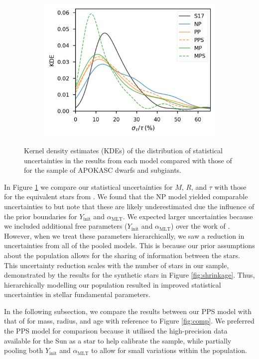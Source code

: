 \documentclass[fleqn,usenatbib]{mnras}
\newcommand{\mlt}{\ensuremath{{\alpha_\mathrm{MLT}}}}
\begin{document}
\begin{figure}
\begin{subfigure}[b]{.33\linewidth}
        \includegraphics[width=\linewidth]{figures/sigma_age.png}
    \end{subfigure}%
    \caption{Kernel density estimates (KDEs) of the distribution of statistical uncertainties in the results from each model compared with those of  for the sample of APOKASC dwarfs and subgiants.}
    \label{fig:unc-comp}
\end{figure}

In Figure \ref{fig:unc-comp} we compare our statistical uncertainties for $M$, $R$, and $\tau$ with those for the equivalent stars from . We found that the NP model yielded comparable uncertainties to  but note that these are likely underestimated due the influence of the prior boundaries for $Y_\mathrm{init}$ and $\mlt$. We expected larger uncertainties because we included additional free parameters ($Y_\mathrm{init}$ and $\mlt$) over the work of . However, when we treat these parameters hierarchically, we saw a reduction in uncertainties from all of the pooled models. This is because our prior assumptions about the population allows for the sharing of information between the stars. This uncertainty reduction scales with the number of stars in our sample, demonstrated by the results for the synthetic stars in Figure \ref{fig:shrinkage}. Thus, hierarchically modelling our population resulted in improved statistical uncertainties in stellar fundamental parameters.

In the following subsection, we compare the results between our PPS model with that of  for mass, radius, and age with reference to Figure \ref{fig:comp}. We preferred the PPS model for comparison because it utilised the high-precision data available for the Sun as a star to help calibrate the sample, while partially pooling both $Y_\mathrm{init}$ and $\mlt$ to allow for small variations within the population.
\end{document}
